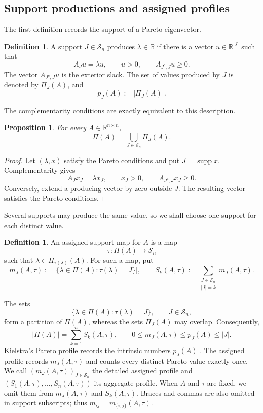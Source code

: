\documentclass[11pt,a4paper]{article}
\newtheorem{proposition}[theorem]{Proposition}
\theoremstyle{definition}
\newtheorem{definition}[theorem]{Definition}
\newcommand{\R}{\mathbb R}
\newcommand{\Supp}{\mathscr S}
\newcommand{\supp}{\operatorname{supp}}
\begin{document}
\subsection{Support productions and assigned profiles}

The first definition records the support of a Pareto eigenvector.

\begin{definition}
A support $J\in\Supp_n$ produces $\lambda\in\R$ if there is
a vector $u\in\R^{|J|}$ such that
$$
A_Ju=\lambda u,
\qquad
u>0,
\qquad
A_{J^{\mathrm c},J}u\geq0.
$$
The vector $A_{J^{\mathrm c},J}u$ is the exterior slack.
The set of values produced by $J$ is denoted by $\Pi_J(A)$, and
$$
p_J(A):=|\Pi_J(A)|.
$$
\end{definition}

The complementarity conditions are exactly equivalent to this
description.

\begin{proposition}
\label{prop:support-criterion}
For every $A\in\R^{n\times n}$,
$$
\Pi(A)
=
\bigcup_{J\in\Supp_n}\Pi_J(A).
$$
\end{proposition}

\begin{proof}
Let $(\lambda,x)$ satisfy the Pareto conditions and put
$J=\supp x$. Complementarity gives
$$
A_Jx_J=\lambda x_J,
\qquad
x_J>0,
\qquad
A_{J^{\mathrm c},J}x_J\geq0.
$$
Conversely, extend a producing vector by zero outside $J$. The
resulting vector satisfies the Pareto conditions.
\end{proof}

Several supports may produce the same value, so we shall choose one
support for each distinct value.

\begin{definition}
An assigned support map for $A$ is a map
$$
\tau:\Pi(A)\longrightarrow\Supp_n
$$
such that $\lambda\in\Pi_{\tau(\lambda)}(A)$. For such a map, put
$$
m_J(A,\tau)
:=
|\{\lambda\in\Pi(A):\tau(\lambda)=J\}|,
\qquad
S_k(A,\tau)
:=
\sum_{\substack{J\in\Supp_n\\ |J|=k}}m_J(A,\tau).
$$
\end{definition}

The sets
$$
\{\lambda\in\Pi(A):\tau(\lambda)=J\},
\qquad
J\in\Supp_n,
$$
form a partition of $\Pi(A)$, whereas the sets $\Pi_J(A)$ may overlap.
Consequently,
$$
|\Pi(A)|=\sum_{k=1}^nS_k(A,\tau),
\qquad
0\leq m_J(A,\tau)\leq p_J(A)\leq|J|.
$$
Kielstra's Pareto profile records the intrinsic numbers $p_J(A)$
\cite[Definition~3.6.6]{Kielstra2023}. The assigned profile records
$m_J(A,\tau)$ and counts every distinct Pareto value exactly once.
We call $(m_J(A,\tau))_{J\in\Supp_n}$ the detailed assigned profile
and $(S_1(A,\tau),\ldots,S_n(A,\tau))$ its aggregate profile.
When $A$ and $\tau$ are fixed, we omit them from $m_J(A,\tau)$ and
$S_k(A,\tau)$. Braces and commas are also omitted in support
subscripts; thus $m_{ij}=m_{\{i,j\}}(A,\tau)$.
\end{document}
